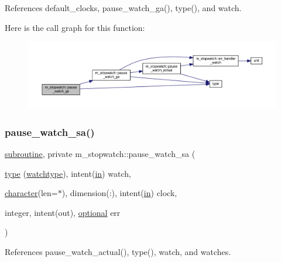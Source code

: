 References default\+\_\+clocks, pause\+\_\+watch\+\_\+ga(), type(), and watch.

Here is the call graph for this function\+:
\nopagebreak
\begin{figure}[H]
\begin{center}
\leavevmode
\includegraphics[width=350pt]{namespacem__stopwatch_a25c025ae33c702473780e6d53dd5e054_cgraph}
\end{center}
\end{figure}
\mbox{\label{namespacem__stopwatch_a5101b247e586498a826e1a7819bf13d5}} 
\subsubsection{\texorpdfstring{pause\+\_\+watch\+\_\+sa()}{pause\_watch\_sa()}}
{\footnotesize\ttfamily \hyperlink{M__stopwatch_83_8txt_acfbcff50169d691ff02d4a123ed70482}{subroutine}, private m\+\_\+stopwatch\+::pause\+\_\+watch\+\_\+sa (\begin{DoxyParamCaption}\item[{\hyperlink{stop__watch_83_8txt_a70f0ead91c32e25323c03265aa302c1c}{type} (\hyperlink{structm__stopwatch_1_1watchtype}{watchtype}), intent(\hyperlink{M__journal_83_8txt_afce72651d1eed785a2132bee863b2f38}{in})}]{watch,  }\item[{\hyperlink{option__stopwatch_83_8txt_abd4b21fbbd175834027b5224bfe97e66}{character}(len=$\ast$), dimension(\+:), intent(\hyperlink{M__journal_83_8txt_afce72651d1eed785a2132bee863b2f38}{in})}]{clock,  }\item[{integer, intent(out), \hyperlink{option__stopwatch_83_8txt_aa4ece75e7acf58a4843f70fe18c3ade5}{optional}}]{err }\end{DoxyParamCaption})\hspace{0.3cm}{\ttfamily [private]}}



References pause\+\_\+watch\+\_\+actual(), type(), watch, and watches.

